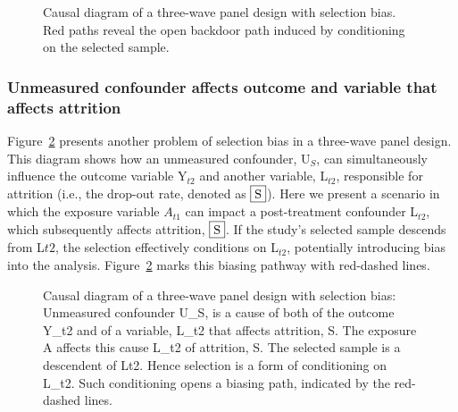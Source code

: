 \documentclass[
  singlecolumn,
  9pt]{article}
\begin{document}
\begin{figure}


\caption{\label{fig-4}Causal diagram of a three-wave panel design with
selection bias. Red paths reveal the open backdoor path induced by
conditioning on the selected sample.}

\end{figure}%

\subsubsection{Unmeasured confounder affects outcome and variable that
affects
attrition}\label{unmeasured-confounder-affects-outcome-and-variable-that-affects-attrition}

Figure~\ref{fig-5} presents another problem of selection bias in a
three-wave panel design. This diagram shows how an unmeasured
confounder, U\(_S\), can simultaneously influence the outcome variable
Y\(_{t2}\) and another variable, L\(_{t2}\), responsible for attrition
(i.e., the drop-out rate, denoted as \(\framebox{S}\)). Here we present
a scenario in which the exposure variable \(A_{t1}\) can impact a
post-treatment confounder L\(_{t2}\), which subsequently affects
attrition, \(\framebox{S}\). If the study's selected sample descends
from L\({t2}\), the selection effectively conditions on L\(_{t2}\),
potentially introducing bias into the analysis. Figure~\ref{fig-5} marks
this biasing pathway with red-dashed lines.

\begin{figure}


\caption{\label{fig-5}Causal diagram of a three-wave panel design with
selection bias: Unmeasured confounder U\_S, is a cause of both of the
outcome Y\_t2 and of a variable, L\_t2 that affects attrition, S. The
exposure A affects this cause L\_t2 of attrition, S. The selected sample
is a descendent of Lt2. Hence selection is a form of conditioning on
L\_t2. Such conditioning opens a biasing path, indicated by the
red-dashed lines.}

\end{figure}%
\end{document}
